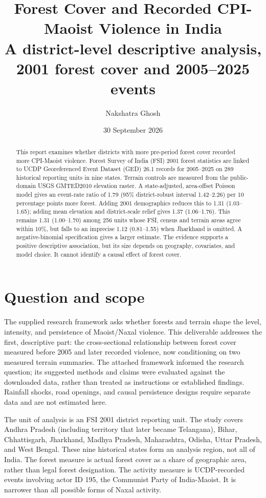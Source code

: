 \documentclass[11pt,a4paper]{article}
\title{Forest Cover and Recorded CPI-Maoist Violence in India\\
\large A district-level descriptive analysis, 2001 forest cover and 2005--2025 events}
\author{Nakshatra Ghosh}
\date{30 September 2026}
\begin{document}
\maketitle

\begin{abstract}
This report examines whether districts with more pre-period forest cover recorded more CPI-Maoist violence. Forest Survey of India (FSI) 2001 forest statistics are linked to UCDP Georeferenced Event Dataset (GED) 26.1 records for 2005--2025 on 289 historical reporting units in nine states. Terrain controls are measured from the public-domain USGS GMTED2010 elevation raster. A state-adjusted, area-offset Poisson model gives an event-rate ratio of 1.79 (95\% district-robust interval 1.42--2.26) per 10 percentage points more forest. Adding 2001 demographics reduces this to 1.31 (1.03--1.65); adding mean elevation and district-scale relief gives 1.37 (1.06--1.76). This remains 1.31 (1.00--1.70) among 256 units whose FSI, census and terrain areas agree within 10\%, but falls to an imprecise 1.12 (0.81--1.55) when Jharkhand is omitted. A negative-binomial specification gives a larger estimate. The evidence supports a positive descriptive association, but its size depends on geography, covariates, and model choice. It cannot identify a causal effect of forest cover.
\end{abstract}

\section{Question and scope}
The supplied research framework asks whether forests and terrain shape the level, intensity, and persistence of Maoist/Naxal violence. This deliverable addresses the first, descriptive part: the cross-sectional relationship between forest cover measured before 2005 and later recorded violence, now conditioning on two measured terrain summaries. The attached framework informed the research question; its suggested methods and claims were evaluated against the downloaded data, rather than treated as instructions or established findings. Rainfall shocks, road openings, and causal persistence designs require separate data and are not estimated here.

The unit of analysis is an FSI 2001 district reporting unit. The study covers Andhra Pradesh (including territory that later became Telangana), Bihar, Chhattisgarh, Jharkhand, Madhya Pradesh, Maharashtra, Odisha, Uttar Pradesh, and West Bengal. These nine historical states form an analysis region, not all of India. The forest measure is actual forest cover as a share of geographic area, rather than legal forest designation. The activity measure is UCDP-recorded events involving actor ID 195, the Communist Party of India-Maoist. It is narrower than all possible forms of Naxal activity.
\end{document}
